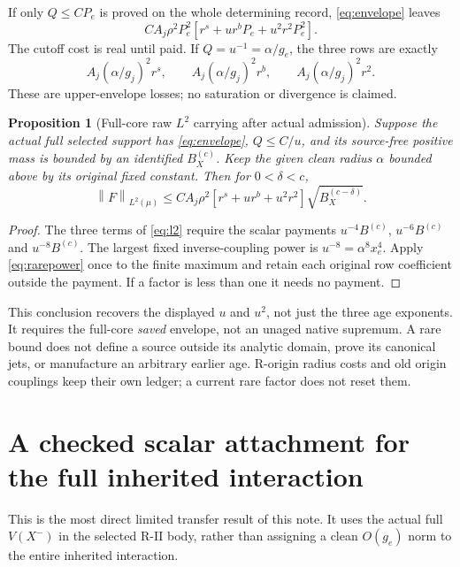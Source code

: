 \documentclass[11pt,letterpaper]{article}
\numberwithin{equation}{section}
\theoremstyle{plain}
\newtheorem{proposition}[theorem]{Proposition}
\theoremstyle{remark}\newtheorem{remark}[theorem]{Scope}
\newcommand{\norm}[1]{\left\lVert#1\right\rVert}
\begin{document}
If only $Q\le CP_e$ is proved on the whole determining record,
\eqref{eq:envelope} leaves
\[
 CA_j\rho^2P_e^2
 \left[r^s+ur^bP_e+u^2r^2P_e^2\right].
\]
The cutoff cost is real until paid. If $Q=u^{-1}=\alpha/g_e$, the three
rows are exactly
\begin{equation}
 A_j(\alpha/g_j)^2r^s,\qquad
 A_j(\alpha/g_j)^2r^b,\qquad
 A_j(\alpha/g_j)^2r^2.
 \label{eq:fullcore}
\end{equation}
These are upper-envelope losses; no saturation or divergence is claimed.

\begin{proposition}[Full-core raw $L^2$ carrying after actual admission]
Suppose the actual full selected support has
\eqref{eq:envelope}, $Q\le C/u$, and its source-free positive mass is
bounded by an identified $B_X^{(c)}$. Keep the given clean radius $\alpha$
bounded above by its original fixed constant. Then for $0<\delta<c$,
\begin{equation}
 \norm F_{L^2(\mu)}\le C A_j\rho^2
 \left[r^s+ur^b+u^2r^2\right]\sqrt{B_X^{(c-\delta)}}.
 \label{eq:fullcorel2}
\end{equation}
\end{proposition}
\begin{proof}
The three terms of \eqref{eq:l2} require the scalar payments
$u^{-4}B^{(c)}$, $u^{-6}B^{(c)}$ and $u^{-8}B^{(c)}$.
The largest fixed inverse-coupling power is
$u^{-8}=\alpha^8x_e^4$. Apply \eqref{eq:rarepower} once to the finite
maximum and retain each original row coefficient outside the payment.
If a factor is less than one it needs no payment.
\end{proof}

This conclusion recovers the displayed $u$ and $u^2$, not just the three
age exponents. It requires the full-core \emph{saved} envelope, not an
unaged native supremum. A rare bound does not define a source outside its
analytic domain, prove its canonical jets, or manufacture an arbitrary
earlier age. R-origin radius costs and old origin couplings keep their own
ledger; a current rare factor does not reset them.

\section{A checked scalar attachment for the full inherited interaction}

This is the most direct limited transfer result of this note.
It uses the actual full $V(X^-)$ in the selected R-II body, rather than
assigning a clean $O(g_e)$ norm to the entire inherited interaction.
\end{document}
